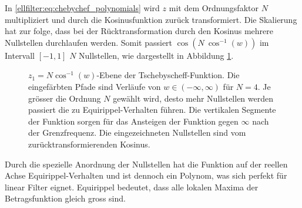 In \eqref{ellfilter:eq:chebychef_polynomials} wird $z$ mit dem Ordnungsfaktor $N$ multipliziert und durch die Kosinusfunktion zurück transformiert.
Die Skalierung hat zur folge, dass bei der Rücktransformation durch den Kosinus mehrere Nullstellen durchlaufen werden.
Somit passiert $\cos( N~\cos^{-1}(w))$ im Intervall $[-1, 1]$ $N$ Nullstellen, wie dargestellt in Abbildung \ref{ellfilter:fig:arccos2}.
\begin{figure}
    \centering
    
    \caption{
        $z_1=N \cos^{-1}(w)$-Ebene der Tschebyscheff-Funktion.
        Die eingefärbten Pfade sind Verläufe von $w\in(-\infty, \infty)$ für $N = 4$.
        Je grösser die Ordnung $N$ gewählt wird, desto mehr Nullstellen werden passiert die zu Equirippel-Verhalten führen.
        Die vertikalen Segmente der Funktion sorgen für das Ansteigen der Funktion gegen $\infty$ nach der Grenzfrequenz.
        Die eingezeichneten Nullstellen sind vom zurücktransformierenden Kosinus.
    }
    \label{ellfilter:fig:arccos2}
\end{figure}
Durch die spezielle Anordnung der Nullstellen hat die Funktion auf der reellen Achse Equirippel-Verhalten und ist dennoch ein Polynom, was sich perfekt für linear Filter eignet.
Equirippel bedeutet, dass alle lokalen Maxima der Betragsfunktion gleich gross sind.

